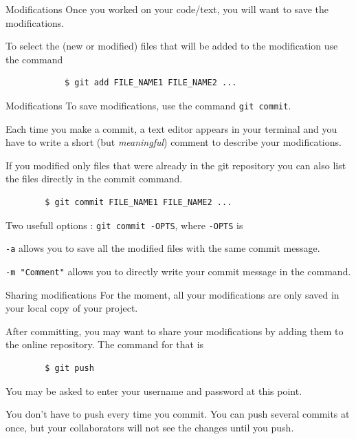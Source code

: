 \documentclass{beamer}
\newcommand{\cmd}[1]{\fbox{\color{black}\texttt{#1}}}
\begin{document}
	\begin{frame}[fragile]{Modifications \hfill \cmd{add}}
		Once you worked on your code/text, you will want to save the modifications. \newline
		
		To select the (new or modified) files that will be added to the modification use the command
		\begin{verbatim}
			$ git add FILE_NAME1 FILE_NAME2 ...
		\end{verbatim}
	\end{frame}

	\begin{frame}[fragile]{Modifications \hfill \cmd{commit}}	
		To save modifications, use the command \texttt{git commit}. \newline 
		
		Each time you make a commit, a text editor appears in your terminal and you have to write a short (but \textit{meaningful}) comment to describe your modifications. \newline
		
		If you modified only files that were already in the git repository you can also list the files directly in the commit command. 
		\begin{verbatim}
		$ git commit FILE_NAME1 FILE_NAME2 ...
		\end{verbatim}
		
		Two usefull options : \texttt{git commit -OPTS}, where \texttt{-OPTS} is
		
		\texttt{-a} allows you to save all the modified files with the same commit message.
		 
		\texttt{-m "Comment"} allows you to directly write your commit message in the command. 		
	\end{frame}

	\begin{frame}[fragile]{Sharing modifications \hfill \cmd{push}}
		For the moment, all your modifications are only saved in your local copy of your project. 
		
		After committing, you may want to share your modifications by adding them to the online repository. The command for that is 
		
		\begin{verbatim}
		$ git push
		\end{verbatim}
		
		You may be asked to enter your username and password at this point.
		
		You don't have to push every time you commit. You can push several commits at once, but your collaborators will not see the changes until you push. 
	\end{frame}
	
\end{document}
